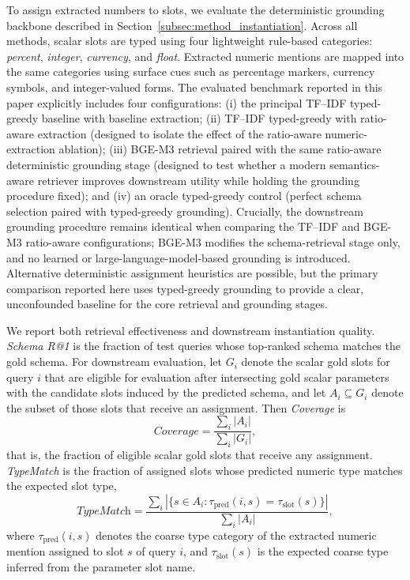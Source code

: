\documentclass[pdflatex,sn-basic,Numbered]{sn-jnl}
\begin{document}
To assign extracted numbers to slots, we evaluate the deterministic grounding backbone described in Section~\ref{subsec:method_instantiation}. Across all methods, scalar slots are typed using four lightweight rule-based categories: \emph{percent}, \emph{integer}, \emph{currency}, and \emph{float}. Extracted numeric mentions are mapped into the same categories using surface cues such as percentage markers, currency symbols, and integer-valued forms. The evaluated benchmark reported in this paper explicitly includes four configurations: (i) the principal TF--IDF typed-greedy baseline with baseline extraction; (ii) TF--IDF typed-greedy with ratio-aware extraction (designed to isolate the effect of the ratio-aware numeric-extraction ablation); (iii) BGE-M3 retrieval paired with the same ratio-aware deterministic grounding stage (designed to test whether a modern semantics-aware retriever improves downstream utility while holding the grounding procedure fixed); and (iv) an oracle typed-greedy control (perfect schema selection paired with typed-greedy grounding). Crucially, the downstream grounding procedure remains identical when comparing the TF--IDF and BGE-M3 ratio-aware configurations; BGE-M3 modifies the schema-retrieval stage only, and no learned or large-language-model-based grounding is introduced. Alternative deterministic assignment heuristics are possible, but the primary comparison reported here uses typed-greedy grounding to provide a clear, unconfounded baseline for the core retrieval and grounding stages.

We report both retrieval effectiveness and downstream instantiation quality. \textit{Schema R@1} is the fraction of test queries whose top-ranked schema matches the gold schema. For downstream evaluation, let $G_i$ denote the scalar gold slots for query $i$ that are eligible for evaluation after intersecting gold scalar parameters with the candidate slots induced by the predicted schema, and let $A_i \subseteq G_i$ denote the subset of those slots that receive an assignment. Then \textit{Coverage} is
\begin{equation}
\textit{Coverage}
=
\frac{\sum_i |A_i|}{\sum_i |G_i|},
\label{eq:coverage}
\end{equation}
that is, the fraction of eligible scalar gold slots that receive any assignment. \textit{TypeMatch} is the fraction of assigned slots whose predicted numeric type matches the expected slot type,
\begin{equation}
\textit{TypeMatch}
=
\frac{\sum_i |\{s \in A_i : \tau_{\mathrm{pred}}(i,s) = \tau_{\mathrm{slot}}(s)\}|}{\sum_i |A_i|},
\label{eq:typematch}
\end{equation}
where $\tau_{\mathrm{pred}}(i,s)$ denotes the coarse type category of the extracted numeric mention assigned to slot $s$ of query $i$, and $\tau_{\mathrm{slot}}(s)$ is the expected coarse type inferred from the parameter slot name.
\end{document}
